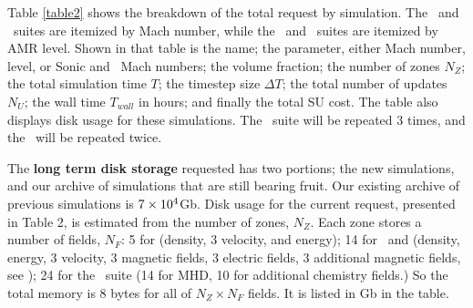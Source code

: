Table \ref{table2} shows the breakdown of the total request by simulation.  The
\nameTurbulence\ and \nameCMB\ suites are itemized by Mach number, while the
\nameCores\ and \nameGalaxies\ suites are itemized by AMR level.  Shown in that
table is the name; the parameter, either Mach number, level, or Sonic and \alf\
Mach numbers;  the volume fraction; the number of zones $N_Z$; the total
simulation time $T$; the timestep size $\Delta T$; the total number of
updates $N_U$; the wall time $T_{wall}$ in hours; and
finally the total SU cost.  The table also displays disk usage for these
simulations.  The \nameCores\ suite will be repeated 3 times, and the
\nameGalaxies\ will be repeated twice.

The {\bf long term disk storage} requested has two portions; the new
simulations, and our archive of simulations that are still bearing fruit.
Our existing archive of previous simulations is $7\times {10^{4}}$Gb.
Disk usage for the current request, presented in Table 2, is estimated from the number of zones, $N_Z$.  Each zone
stores a number of fields, $N_F$: 5 for \nameTurbulence (density, 3 velocity, and
energy); 14 for \nameCores\ and
\nameCMB (density, energy, 3 velocity, 3 magnetic fields, 3 electric fields, 3
additional magnetic fields, see \citet{Collins10}); 24 for the \nameGalaxies\
suite (14 for MHD, 10 for additional chemistry fields.)  So the total memory is
8 bytes for all of $N_Z\times N_F$ fields.  It is listed in Gb in the table.


